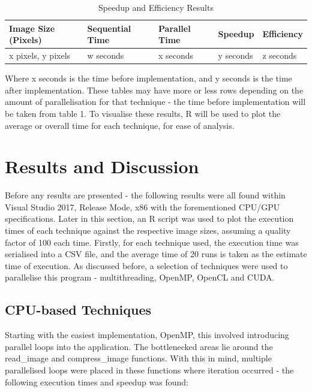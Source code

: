\documentclass[12pt, a4paper]{article}
\begin{document}
\begin{table}[H]
    \centering
    \begin{tabular}{| l | l | l | l | l |}
    \hline
    Image Size (Pixels) & Sequential Time & Parallel Time & Speedup & Efficiency\\ \hline
    x pixels, y pixels & w seconds & x seconds & y seconds & z seconds \\ \hline
    \end{tabular}
    \caption{Speedup and Efficiency Results}
\end{table}

Where x seconds is the time before implementation, and y seconds is the time after implementation. These tables may have more or less rows depending on the amount of parallelisation for that technique - the time before implementation will be taken from table 1. To visualise these results, R will be used to plot the average or overall time for each technique, for ease of analysis.

\section{Results and Discussion}
Before any results are presented - the following results were all found within Visual Studio 2017, Release Mode, x86 with the forementioned CPU/GPU specifications. Later in this section, an R script was used to plot the execution times of each technique against the respective image sizes, assuming a quality factor of 100 each time.
Firstly, for each technique used, the execution time was serialised into a CSV file, and the average time of 20 runs is taken as the estimate time of execution. As discussed before, a selection of techniques were used to parallelise this program - multithreading, OpenMP, OpenCL and CUDA.

\subsection{CPU-based Techniques}
Starting with the easiest implementation, OpenMP, this involved introducing parallel loops into the application. The bottlenecked areas lie around the read\_image and compress\_image functions. With this in mind, multiple parallelised loops were placed in these functions where iteration occurred - the following execution times and speedup was found:
\end{document}
